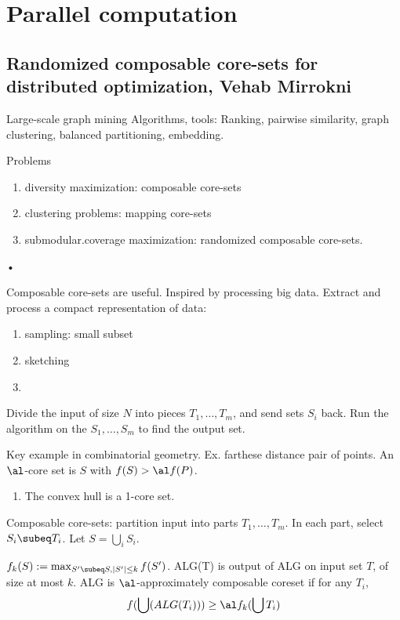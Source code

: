 
\section{Parallel computation}
\subsection{Randomized composable core-sets for distributed optimization, Vehab Mirrokni}


Large-scale graph mining
Algorithms, tools: Ranking, pairwise similarity, graph clustering, balanced partitioning, embedding.

Problems
\begin{enumerate}
\item
diversity maximization: composable core-sets
\item
clustering problems: mapping core-sets
\item
submodular.coverage maximization: randomized composable core-sets.
\end{enumerate}•

Composable core-sets are useful. 
Inspired by processing big data. Extract and process a compact representation of data:
\begin{enumerate}
\item
sampling: small subset
\item
sketching
\item
\end{enumerate}

Divide the input of size $N$ into pieces $T_1,\ldots, T_m$, and send sets $S_i$ back. Run the algorithm on the $S_1,\ldots, S_m$ to find the output set.

Key example in combinatorial geometry. Ex. farthese distance pair of points. An $\al$-core set is $S$ with $f(S)>\al f(P)$.
\begin{enumerate}
\item
The convex hull is a 1-core set.
\end{enumerate}
Composable core-sets: partition input into parts $T_1,\ldots, T_m$. In each part, select $S_i\subeq T_i$. Let $S=\bigcup_i S_i$.

$f_k(S):=\max_{S'\subeq S,|S'|\le k} f(S')$. ALG(T) is output of ALG on input set $T$, of size at most $k$. 
ALG is $\al$-approximately composable coreset if for any $T_i$,
\[
f(\bigcup(ALG(T_i)))\ge \al f_k(\bigcup T_i)
\]

